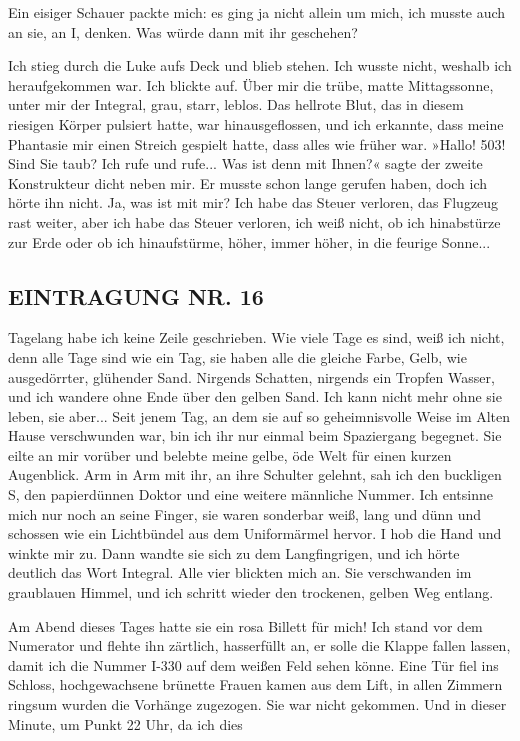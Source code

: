 Ein eisiger Schauer packte mich: es ging ja nicht allein um mich,
ich musste auch an sie, an I, denken. Was würde dann mit ihr
geschehen?

Ich stieg durch die Luke aufs Deck und blieb stehen. Ich wusste
nicht, weshalb ich heraufgekommen war. Ich blickte auf. Über mir
die trübe, matte Mittagssonne, unter mir der Integral, grau, starr,
leblos. Das hellrote Blut, das in diesem riesigen Körper pulsiert
hatte, war hinausgeflossen, und ich erkannte, dass meine Phantasie
mir einen Streich gespielt hatte, dass alles wie früher war.
»Hallo! 503! Sind Sie taub? Ich rufe und rufe... Was ist denn mit
Ihnen?« sagte der zweite Konstrukteur dicht neben mir. Er musste
schon lange gerufen haben, doch ich hörte ihn nicht. Ja, was ist
mit mir? Ich habe das Steuer verloren, das Flugzeug rast weiter,
aber ich habe das Steuer verloren, ich weiß nicht, ob ich
hinabstürze zur Erde oder ob ich hinaufstürme, höher, immer höher,
in die feurige Sonne...

\subsection{EINTRAGUNG NR. 16}

Tagelang habe ich keine Zeile geschrieben. Wie viele Tage es sind,
weiß ich nicht, denn alle Tage sind wie ein Tag, sie haben alle die
gleiche Farbe, Gelb, wie ausgedörrter, glühender Sand. Nirgends
Schatten, nirgends ein Tropfen Wasser, und ich wandere ohne Ende
über den gelben Sand. Ich kann nicht mehr ohne sie leben, sie
aber... Seit jenem Tag, an dem sie auf so geheimnisvolle Weise im
Alten Hause verschwunden war, bin ich ihr nur einmal beim
Spaziergang begegnet. Sie eilte an mir vorüber und belebte meine
gelbe, öde Welt für einen kurzen Augenblick. Arm in Arm mit ihr, an
ihre Schulter gelehnt, sah ich den buckligen S, den papierdünnen
Doktor und eine weitere männliche Nummer. Ich entsinne mich nur
noch an seine Finger, sie waren sonderbar weiß, lang und dünn und
schossen wie ein Lichtbündel aus dem Uniform­ärmel hervor. I hob
die Hand und winkte mir zu. Dann wandte sie sich zu dem
Langfingrigen, und ich hörte deutlich das Wort Integral. Alle vier
blickten mich an. Sie verschwanden im graublauen Himmel, und ich
schritt wieder den trockenen, gelben Weg entlang.

Am Abend dieses Tages hatte sie ein rosa Billett für mich! Ich
stand vor dem Numerator und flehte ihn zärtlich, hasserfüllt an, er
solle die Klappe fallen lassen, damit ich die Nummer I-330 auf dem
weißen Feld sehen könne. Eine Tür fiel ins Schloss, hochgewachsene
brünette Frauen kamen aus dem Lift, in allen Zimmern ringsum wurden
die Vorhänge zugezogen. Sie war nicht gekommen. Und in dieser
Minute, um Punkt 22 Uhr, da ich dies

